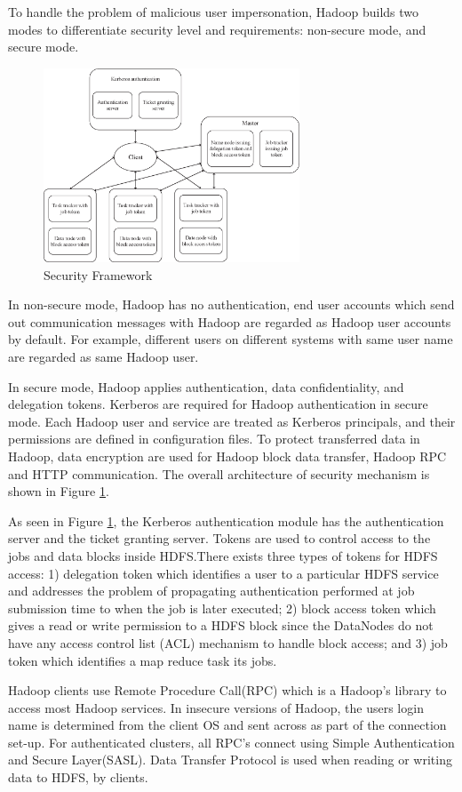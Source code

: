 To handle the problem of malicious user impersonation, Hadoop builds two modes to differentiate security level and requirements: non-secure mode, and secure mode.
\begin{figure}[t]
  \centering
  \includegraphics[width=3in]{figs/security_hadoop.eps}
  \caption{Security Framework}
  \label{fig:KerberosOverview}
\end{figure}
In non-secure mode, Hadoop has no authentication, end user accounts which send out communication messages with Hadoop are regarded as Hadoop user accounts by default. For example, different users on different systems with same user name are regarded as same Hadoop user.

In secure mode, Hadoop applies authentication, data confidentiality, and delegation tokens. Kerberos are required for Hadoop authentication in secure mode. Each Hadoop user and service are treated as Kerberos principals, and their permissions are defined in configuration files. To protect transferred data in Hadoop, data encryption are used for Hadoop block data transfer, Hadoop RPC and HTTP communication. The overall architecture of security mechanism is shown in Figure \ref{fig:KerberosOverview}.

As seen in Figure \ref{fig:KerberosOverview}, the Kerberos authentication module has the authentication server and the ticket granting server. Tokens are used to control access to the jobs and data blocks inside HDFS.There exists three types of tokens for HDFS access: 1) delegation token which identifies a user to a particular HDFS service and addresses the problem of propagating authentication performed at job submission time to when the job is later executed; 2) block access token which gives a read or write permission to a HDFS block since the DataNodes do not have any access control list (ACL) mechanism to handle block access; and 3) job token which identifies a map reduce task its jobs.

Hadoop clients use Remote Procedure Call(RPC) which is a Hadoop’s library to access most Hadoop services. In insecure versions of Hadoop, the users login name is determined from the client OS and sent across as part of the connection set-up. For authenticated clusters, all RPC’s connect using Simple Authentication and Secure Layer(SASL). Data Transfer Protocol is used when reading or writing data to HDFS, by clients.

